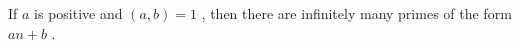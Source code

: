 If  $ a $  is positive and  $ (a,b)=1 $ , then there are infinitely many
primes of the form  $ an+b $ .


